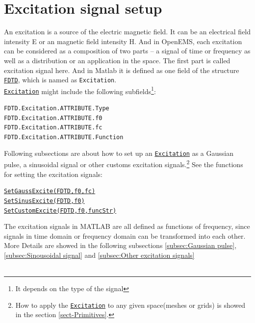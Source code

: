 \section{Excitation signal setup} \label{sec:FDTD_Excitation}
An excitation  is a source of the  electric magnetic field. It can be  an electrical field intensity E or an magnetic field intensity H. And  in OpenEMS, each excitation can be considered as a composition  of two parts -- a signal of  time or  frequency as well as  a distribution or an application in the space. The first part is called excitation signal here. And in Matlab it is defined as one field of the structure \hyperref[para:FDTD]{\texttt{FDTD}}, which is named as \texttt{Excitation}.  \label{para:Excitation} \\%

\hyperref[para:Excitation]{\texttt{Excitation}} might include the following  subfields\footnote{It depends on the type of the signal}: 
       \begin{myindentpar}
	      \texttt{FDTD.Excitation.ATTRIBUTE.Type} \\ 
	      \texttt{FDTD.Excitation.ATTRIBUTE.f0} \\ 
	      \texttt{FDTD.Excitation.ATTRIBUTE.fc} \\
              \texttt{FDTD.Excitation.ATTRIBUTE.Function}
       \end{myindentpar}

 Following subsections are  about how to set up an \hyperref[para:Excitation]{\texttt{Excitation}} as a Gaussian pulse, a sinusoidal signal or other customs excitation signals.\footnote{How to apply the \hyperref[para:Excitation]{\texttt{Excitation}}  to any given space(meshes or grids) is showed in the section \ref{sect-Primitives}.} See the functions for setting the excitation signals:
       \begin{myindentpar}
	      \hyperref[func:SetGaussExcite]{\texttt{SetGaussExcite(FDTD,f0,fc)}} \\ 
	      \hyperref[func:SetSinusExcite]{\texttt{SetSinusExcite(FDTD,f0)}}\\ 
	      \hyperref[func:SetCustomExcite]{\texttt{SetCustomExcite(FDTD,f0,funcStr)}}
       \end{myindentpar}
The excitation signals in MATLAB are all defined as  functions of frequency, since signals in time domain or frequency domain can be transformed into each other.   More Details are showed in the following subsections \ref{subsec:Gaussian pulse}, \ref{subsec:Sinousoidal signal} and \ref{subsec:Other excitation signals}\\
\\

